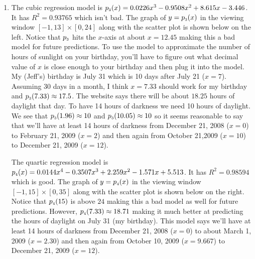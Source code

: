 \documentclass{ximera}
\begin{document}
\begin{enumerate}
\setcounter{enumi}{\value{HW}}


\item The cubic regression model is $p_{\mbox{\tiny $3$}}(x) = 0.0226x^{3} - 0.9508x^{2} + 8.615x - 3.446$.  It has $R^{2} = 0.93765$ which isn't bad.  The graph of $y = p_{\mbox{\tiny $3$}}(x)$ in the viewing window $[-1,13] \times [0, 24]$ along with the scatter plot is shown below on the left.  Notice that $p_{\mbox{\tiny $3$}}$ hits the $x$-axis at about $x = 12.45$ making this a bad model for future predictions.  To use the model to approximate the number of hours of sunlight on your birthday, you'll have to figure out what decimal value of $x$ is close enough to your birthday and then plug it into the model.  My (Jeff's) birthday is July 31 which is 10 days after July 21 ($x = 7$).  Assuming 30 days in a month, I think $x = 7.33$ should work for my birthday and $p_{\mbox{\tiny $3$}}(7.33) \approx 17.5$.  The website says there will be about $18.25$ hours of daylight that day.  To have 14 hours of darkness we need 10 hours of daylight.  We see that $p_{\mbox{\tiny $3$}}(1.96) \approx 10$ and $p_{\mbox{\tiny $3$}}(10.05) \approx 10$ so it seems reasonable to say that we'll have at least 14 hours of darkness from December 21, 2008 ($x = 0$) to February 21, 2009 ($x = 2$) and then again from October 21,2009 ($x = 10$) to December 21, 2009 ($x = 12$).

\smallskip

The quartic regression model is $p_{\mbox{\tiny $4$}}(x) = 0.0144x^{4} - 0.3507x^{3} + 2.259x^{2} - 1.571x + 5.513$.  It has $R^{2} = 0.98594$ which is good.  The graph of $y = p_{\mbox{\tiny $4$}}(x)$ in the viewing window $[-1, 15] \times [0, 35]$ along with the scatter plot is shown below on the right.  Notice that $p_{\mbox{\tiny $4$}}(15)$ is above $24$ making this a bad model as well for future predictions.  However, $p_{\mbox{\tiny $4$}}(7.33) \approx 18.71$ making it much better at predicting the hours of daylight on July 31 (my birthday).  This model says we'll have at least 14 hours of darkness from December 21, 2008 ($x = 0$) to about March 1, 2009 ($x = 2.30$) and then again from October 10, 2009 ($x = 9.667$) to December 21, 2009 ($x = 12$).

\begin{center}

\begin{tabular}{cc}



\end{tabular}
\end{center}
\end{enumerate}
\end{document}
